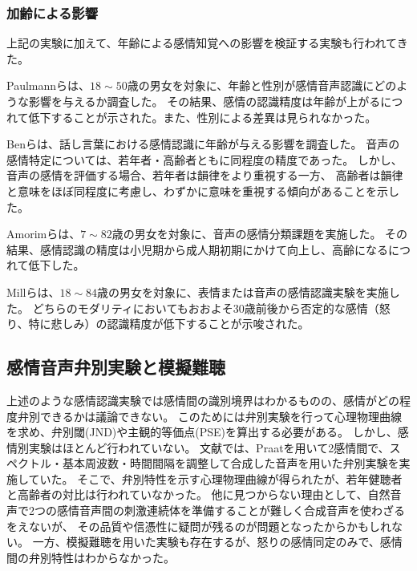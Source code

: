 \subsubsection{加齢による影響}
上記の実験に加えて、年齢による感情知覚への影響を検証する実験も行われてきた。

Paulmannらは、$18 \sim 50$歳の男女を対象に、年齢と性別が感情音声認識にどのような影響を与えるか調査した\cite{paulmann2008aging}。
その結果、感情の認識精度は年齢が上がるにつれて低下することが示された。また、性別による差異は見られなかった。

Benらは、話し言葉における感情認識に年齢が与える影響を調査した\cite{ben2019age}。
音声の感情特定については、若年者・高齢者ともに同程度の精度であった。
しかし、音声の感情を評価する場合、若年者は韻律をより重視する一方、
高齢者は韻律と意味をほぼ同程度に考慮し、わずかに意味を重視する傾向があることを示した。

Amorimらは、$7 \sim 82$歳の男女を対象に、音声の感情分類課題を実施した\cite{amorim2021changes}。
その結果、感情認識の精度は小児期から成人期初期にかけて向上し、高齢になるにつれて低下した。

Millらは、$18 \sim 84$歳の男女を対象に、表情または音声の感情認識実験を実施した。
どちらのモダリティにおいてもおおよそ30歳前後から否定的な感情（怒り、特に悲しみ）の認識精度が低下することが示唆された。


\subsection{感情音声弁別実験と模擬難聴}
上述のような感情認識実験では感情間の識別境界はわかるものの、感情がどの程度弁別できるかは議論できない。
このためには弁別実験を行って心理物理曲線を求め、弁別閾(JND)や主観的等価点(PSE)を算出する必要がある。
しかし、感情別実験はほとんど行われていない。
文献\cite{laukka2005categorical}では、Praat\cite{boersma2001speak}を用いて2感情間で、スペクトル・基本周波数・時間間隔を調整して合成した音声を用いた弁別実験を実施していた。
そこで、弁別特性を示す心理物理曲線が得られたが、若年健聴者と高齢者の対比は行われていなかった。
他に見つからない理由として、自然音声で2つの感情音声間の刺激連続体を準備することが難しく合成音声を使わざるをえないが、
その品質や信憑性に疑問が残るのが問題となったからかもしれない。
一方、模擬難聴を用いた実験も存在するが、怒りの感情同定\cite{morgan2022perceived}のみで、感情間の弁別特性はわからなかった。

